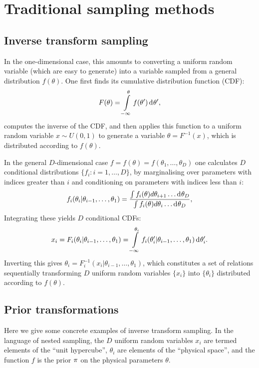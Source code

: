 \section{Traditional sampling methods}
\label{chp:sm}
\subsection{Inverse transform sampling}
\label{sec:sm:inverse_transform}

In the one-dimensional case, this amounts to converting a uniform random variable (which are easy to generate) into a variable sampled from a general distribution \(f(\theta)\). One first finds its cumulative distribution function (CDF):
\begin{equation}
  F(\theta) = \int\limits_{-\infty}^\theta f(\theta^\prime) \operatorname{d}^{}\!{\theta^\prime},
\end{equation}
computes the inverse of the CDF, and then applies this function to a uniform random variable  \(x\sim U(0,1)\) to generate a variable \(\theta = F^{-1}(x)\), which is distributed according to \(f(\theta)\). 

In the general \(D\)-dimensional case \(f=f(\theta)=f(\theta_1,\ldots,\theta_D)\) one calculates \(D\) conditional distributions \(\{f_i:i=1,\ldots,D\}\), by marginalising over parameters with indices greater than \(i\) and conditioning on parameters with indices less than \(i\):
%
\begin{equation}
  f_i(\theta_i|\theta_{i-1},\ldots,\theta_1) 
  =
  \frac{%
    \int f_i(\theta) d\theta_{i+1}\ldots \d{\theta_{D}}
  }{%
    \int f_i(\theta) d\theta_{i}\ldots \d{\theta_{D}}
  },
\end{equation}
%
Integrating these yields \(D\) conditional CDFs:
%
\begin{equation}
  x_i = F_i(\theta_i|\theta_{i-1},\ldots,\theta_1) = \int\limits_{-\infty}^{\theta_i} f_i(\theta_i^\prime|\theta_{i-1},\ldots,\theta_1) \operatorname{d}^{}\!{\theta_i^\prime}.
\end{equation}
%
Inverting this gives \(\theta_i = F^{-1}_i(x_i|\theta_{i-1},\ldots,\theta_1)\), which constitutes a set of relations sequentially transforming \(D\) uniform random variables \(\{x_i\}\) into \(\{\theta_i\}\) distributed according to \(f(\theta)\).


\subsection{Prior transformations}
\label{sec:pc:prior_transformations}
Here we give some concrete examples of inverse transform sampling. In the language of nested sampling, the \(D\) uniform random variables \(x_i\) are termed elements of the ``unit hypercube'', \(\theta_i\) are elements of the ``physical space'', and the function $f$ is the prior \(\pi\) on the physical parameters \(\theta\).

